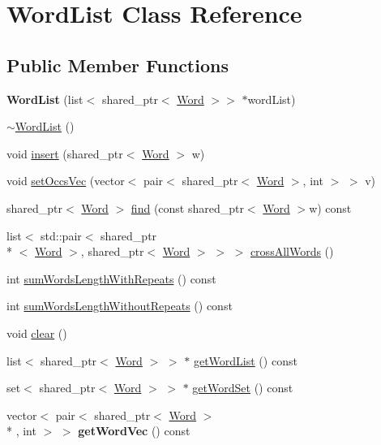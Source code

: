 \hypertarget{classWordList}{\section{Word\-List Class Reference}
\label{classWordList}
}
\subsection*{Public Member Functions}
\begin{DoxyCompactItemize}
\item 
\hypertarget{classWordList_ad08a442d735959fa34bdcbdf83a03039}{{\bfseries Word\-List} (list$<$ shared\-\_\-ptr$<$ \hyperlink{classWord}{Word} $>$$>$ $\ast$word\-List)}\label{classWordList_ad08a442d735959fa34bdcbdf83a03039}

\item 
\hyperlink{classWordList_a51ee5b595a3812e94ea691120eb3df4e}{$\sim$\-Word\-List} ()
\item 
void \hyperlink{classWordList_a73e587d2f0c94919303c3873cecae43b}{insert} (shared\-\_\-ptr$<$ \hyperlink{classWord}{Word} $>$ w)
\item 
void \hyperlink{classWordList_a1526b6133bf3f55a802e431fe2e60c70}{set\-Occs\-Vec} (vector$<$ pair$<$ shared\-\_\-ptr$<$ \hyperlink{classWord}{Word} $>$, int $>$ $>$ v)
\item 
shared\-\_\-ptr$<$ \hyperlink{classWord}{Word} $>$ \hyperlink{classWordList_a9f2ec2dfb5f8670f9fc5420d2c9d3cfb}{find} (const shared\-\_\-ptr$<$ \hyperlink{classWord}{Word} $>$w) const 
\item 
list$<$ std\-::pair$<$ shared\-\_\-ptr\\*
$<$ \hyperlink{classWord}{Word} $>$, shared\-\_\-ptr$<$ \hyperlink{classWord}{Word} $>$ $>$ $>$ \hyperlink{classWordList_aee1a575e29d33758d632a601316fb803}{cross\-All\-Words} ()
\item 
int \hyperlink{classWordList_acba58ad886cc0029592df6c942b4dd2b}{sum\-Words\-Length\-With\-Repeats} () const 
\item 
int \hyperlink{classWordList_aedf495a6048450a25ac3754a0081f834}{sum\-Words\-Length\-Without\-Repeats} () const 
\item 
void \hyperlink{classWordList_aaab2e68dcf66a71ad5441c93266a1746}{clear} ()
\item 
list$<$ shared\-\_\-ptr$<$ \hyperlink{classWord}{Word} $>$ $>$ $\ast$ \hyperlink{classWordList_a2762e9ee93989472cf787b0cbda73cea}{get\-Word\-List} () const 
\item 
set$<$ shared\-\_\-ptr$<$ \hyperlink{classWord}{Word} $>$ $>$ $\ast$ \hyperlink{classWordList_afb3441c905e2b67dbc9b4e565e530c66}{get\-Word\-Set} () const 
\item 
\hypertarget{classWordList_a13390f6a405e412b79cab3586f5a7a48}{vector$<$ pair$<$ shared\-\_\-ptr$<$ \hyperlink{classWord}{Word} $>$\\*
, int $>$ $>$ {\bfseries get\-Word\-Vec} () const }\label{classWordList_a13390f6a405e412b79cab3586f5a7a48}


\end{DoxyCompactItemize}
